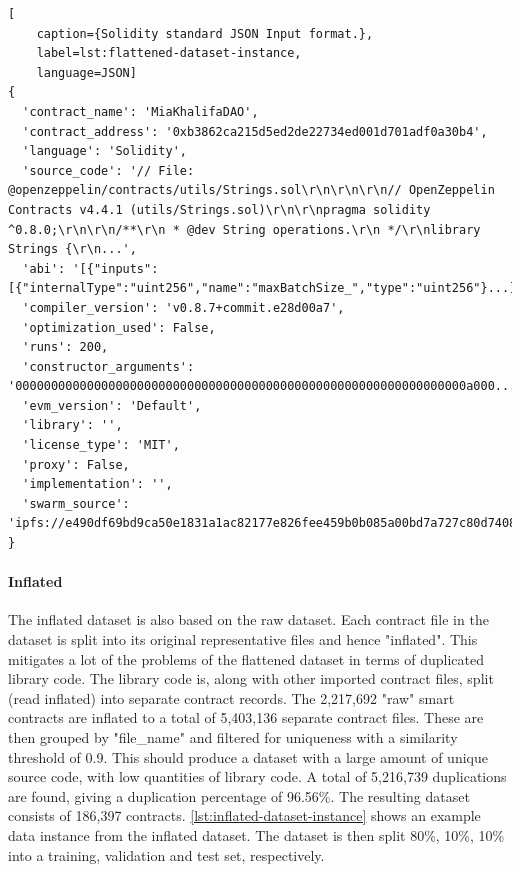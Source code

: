 \begin{lstlisting}[
    caption={Solidity standard JSON Input format.},
    label=lst:flattened-dataset-instance,
    language=JSON]
{
  'contract_name': 'MiaKhalifaDAO',
  'contract_address': '0xb3862ca215d5ed2de22734ed001d701adf0a30b4',
  'language': 'Solidity',
  'source_code': '// File: @openzeppelin/contracts/utils/Strings.sol\r\n\r\n\r\n// OpenZeppelin Contracts v4.4.1 (utils/Strings.sol)\r\n\r\npragma solidity ^0.8.0;\r\n\r\n/**\r\n * @dev String operations.\r\n */\r\nlibrary Strings {\r\n...',
  'abi': '[{"inputs":[{"internalType":"uint256","name":"maxBatchSize_","type":"uint256"}...]',
  'compiler_version': 'v0.8.7+commit.e28d00a7',
  'optimization_used': False,
  'runs': 200,
  'constructor_arguments': '000000000000000000000000000000000000000000000000000000000000000a000...',
  'evm_version': 'Default',
  'library': '',
  'license_type': 'MIT',
  'proxy': False,
  'implementation': '',
  'swarm_source': 'ipfs://e490df69bd9ca50e1831a1ac82177e826fee459b0b085a00bd7a727c80d74089'
}
\end{lstlisting}

\paragraph{Inflated}
\label{sec:verified-smart-contracts-inflated}
The inflated dataset is also based on the raw dataset. Each contract file in the dataset is split into its original representative files and hence  "inflated". This mitigates a lot of the problems of the flattened dataset in terms of duplicated library code. The library code is, along with other imported contract files, split (read inflated) into separate contract records. The 2,217,692 "raw" smart contracts are inflated to a total of 5,403,136 separate contract files. These are then grouped by "file\_name" and filtered for uniqueness with a similarity threshold of 0.9. This should produce a dataset with a large amount of unique source code, with low quantities of library code. A total of 5,216,739 duplications are found, giving a duplication percentage of 96.56\%. The resulting dataset consists of 186,397 contracts. \cref{lst:inflated-dataset-instance} shows an example data instance from the inflated dataset. The dataset is then split 80\%, 10\%, 10\% into a training, validation and test set, respectively.





